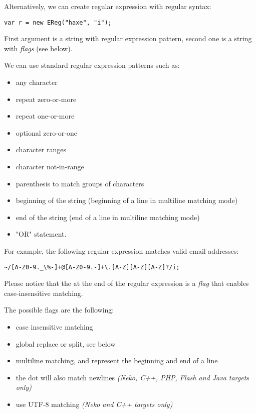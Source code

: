 Alternatively, we can create regular expression with regular syntax:

\begin{lstlisting}
var r = new EReg("haxe", "i");
\end{lstlisting}

First argument is a string with regular expression pattern, second one is a string with \emph{flags} (see below).

We can use standard regular expression patterns such as:
\begin{itemize}
	\item {} any character
	\item \expr{*} repeat zero-or-more
	\item \expr{+} repeat one-or-more
	\item {} optional zero-or-one
	\item \expr{[A-Z0-9]} character ranges
	\item {} character not-in-range
	\item {} parenthesis to match groups of characters
	\item \expr{\textasciicircum} beginning of the string (beginning of a line in multiline matching mode)
	\item \expr{\$} end of the string (end of a line in multiline matching mode)
	\item \expr{|} "OR" statement.
\end{itemize}

For example, the following regular expression matches valid email addresses:
\begin{lstlisting}
~/[A-Z0-9._\%-]+@[A-Z0-9.-]+\.[A-Z][A-Z][A-Z]?/i;
\end{lstlisting}

Please notice that the  at the end of the regular expression is a \emph{flag} that enables case-insensitive matching.

The possible flags are the following:
\begin{itemize}
	\item {} case insensitive matching
	\item {} global replace or split, see below
	\item {} multiline matching, \expr{\textasciicircum} and \expr{\$} represent the beginning and end of a line
	\item {} the dot  will also match newlines \emph{(Neko, C++, PHP, Flash and Java targets only)}
	\item {} use UTF-8 matching \emph{(Neko and C++ targets only)}
\end{itemize}

